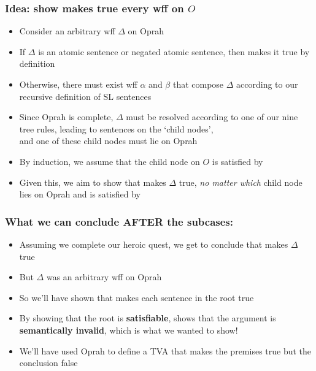 \begin{frame}
\frametitle{Idea: show  makes true every wff on $O$}

\begin{itemize}[<+->]

\item Consider an arbitrary wff $\Delta$ on Oprah

\item If $\Delta$ is an atomic sentence or negated atomic sentence, then  makes it true by definition 

\item Otherwise, there must exist wff $\alpha$ and $\beta$ that compose $\Delta$ according to our recursive definition of SL sentences

\item Since Oprah is complete, $\Delta$ must be resolved according to one of our nine tree rules, leading to sentences on the `child nodes', \\ and one of these child nodes must lie on Oprah

\item By induction, we assume that the child node on $O$ is satisfied by 

\item Given this, we aim to show that  makes $\Delta$ true, \emph{no matter which} child node lies on Oprah and is satisfied by 

\end{itemize}
\end{frame}

\begin{frame}
\frametitle{What we can conclude AFTER the subcases:}

\begin{itemize}[<+->]

\item Assuming we complete our heroic quest, we get to conclude that  makes $\Delta$ true

\item But $\Delta$ was an arbitrary wff on Oprah

\item So we'll have shown that  makes each sentence in the root true

\item By showing that the root is \textbf{\textcolor{OGlyallpink}{satisfiable}},  shows that the argument is \textbf{\textcolor{OGlyallpink}{semantically invalid}}, which is what we wanted to show! 

\item We'll have used Oprah to define a TVA that makes the premises true but the conclusion false

\end{itemize}
\end{frame}





